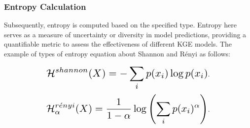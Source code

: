 \documentclass{article}
\begin{document}
\subsubsection{Entropy Calculation}
Subsequently, entropy is computed based on the specified type. Entropy here serves as a measure of uncertainty or diversity in model predictions, providing a quantifiable metric to assess the effectiveness of different KGE models. The example of types of entropy equation about Shannon and Rényi as follows:

\begin{equation}
    \label{eq:shannon}
    \resizebox{.68\linewidth}{!}{$
            \displaystyle
            \mathcal{H}^{shannon}(X) = -\sum_{i} p(x_i) \log p(x_i)
        $}.
\end{equation}
\begin{equation}
    \label{eq:renyi}
    \resizebox{.68\linewidth}{!}{$
            \displaystyle
            \mathcal{H}_{\alpha}^{r\acute{e}nyi}(X) = \frac{1}{1-\alpha} \log \left( \sum_{i} p(x_i)^\alpha \right)
        $}.
\end{equation}







\end{document}
